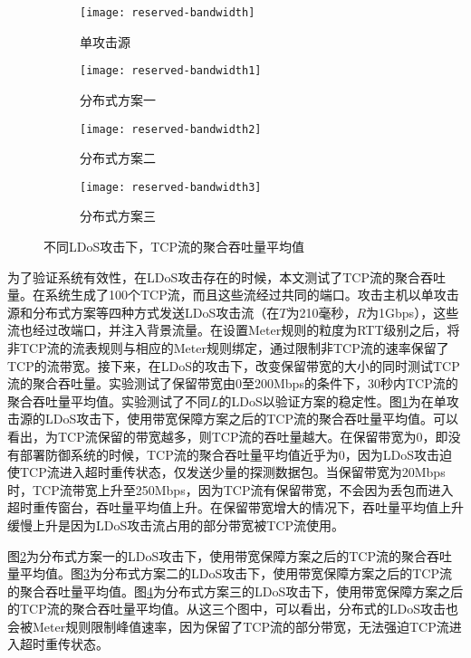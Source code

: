 \begin{figure}
    \begin{subfigure}{.49\textwidth}
        \centering
        \texttt{[image: reserved-bandwidth]}
        \caption{单攻击源}
        \label{fig:reserved-bandwidth-single}
    \end{subfigure}
    \begin{subfigure}{.49\textwidth}
        \centering
        \texttt{[image: reserved-bandwidth1]}
        \caption{分布式方案一}
        \label{fig:reserved-bandwidth-2h-mod1}
    \end{subfigure}

    \begin{subfigure}{.49\textwidth}
        \centering
        \texttt{[image: reserved-bandwidth2]}
        \caption{分布式方案二}
        \label{fig:reserved-bandwidth-2h-mod2}
    \end{subfigure}
    \begin{subfigure}{.49\textwidth}
        \centering
        \texttt{[image: reserved-bandwidth3]}
        \caption{分布式方案三}
        \label{fig:reserved-bandwidth-2h-mod3}
    \end{subfigure}


    \caption{不同LDoS攻击下，TCP流的聚合吞吐量平均值}
    \label{fig:reserved-bandwidth-all}
\end{figure}

为了验证系统有效性，在LDoS攻击存在的时候，本文测试了TCP流的聚合吞吐量。在系统生成了100个TCP流，而且这些流经过共同的端口。攻击主机以单攻击源和分布式方案等四种方式发送LDoS攻击流（在$T$为210毫秒，$R$为1Gbps），这些流也经过改端口，并注入背景流量。在设置Meter规则的粒度为RTT级别之后，将非TCP流的流表规则与相应的Meter规则绑定，通过限制非TCP流的速率保留了TCP的流带宽。接下来，在LDoS的攻击下，改变保留带宽的大小的同时测试TCP流的聚合吞吐量。实验测试了保留带宽由0至200Mbps的条件下，30秒内TCP流的聚合吞吐量平均值。实验测试了不同$L$的LDoS以验证方案的稳定性。图\ref{fig:reserved-bandwidth-single}为在单攻击源的LDoS攻击下，使用带宽保障方案之后的TCP流的聚合吞吐量平均值。可以看出，为TCP流保留的带宽越多，则TCP流的吞吐量越大。在保留带宽为0，即没有部署防御系统的时候，TCP流的聚合吞吐量平均值近乎为0，因为LDoS攻击迫使TCP流进入超时重传状态，仅发送少量的探测数据包。当保留带宽为20Mbps时，TCP流带宽上升至250Mbps，因为TCP流有保留带宽，不会因为丢包而进入超时重传窗台，吞吐量平均值上升。在保留带宽增大的情况下，吞吐量平均值上升缓慢上升是因为LDoS攻击流占用的部分带宽被TCP流使用。

图\ref{fig:reserved-bandwidth-2h-mod1}为分布式方案一的LDoS攻击下，使用带宽保障方案之后的TCP流的聚合吞吐量平均值。图\ref{fig:reserved-bandwidth-2h-mod2}为分布式方案二的LDoS攻击下，使用带宽保障方案之后的TCP流的聚合吞吐量平均值。图\ref{fig:reserved-bandwidth-2h-mod3}为分布式方案三的LDoS攻击下，使用带宽保障方案之后的TCP流的聚合吞吐量平均值。从这三个图中，可以看出，分布式的LDoS攻击也会被Meter规则限制峰值速率，因为保留了TCP流的部分带宽，无法强迫TCP流进入超时重传状态。



